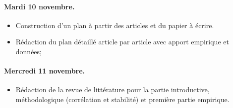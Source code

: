 \documentclass[11pt, a4paper]{article}
\begin{document}
\paragraph{Mardi 10 novembre.} 
\begin{itemize}
    \item Construction d'un plan à partir des articles et du papier à écrire.
    \item Rédaction du plan détaillé article par article avec apport empirique et données;
\end{itemize}

\paragraph{Mercredi 11 novembre.}
\begin{itemize}
    \item Rédaction de la revue de littérature pour la partie introductive, méthodologique (corrélation et stabilité) et première partie empirique.
\end{itemize}


\clearpage


\end{document}
